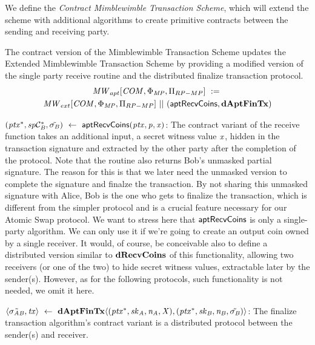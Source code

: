 We define the \emph{Contract Mimblewimble Transaction Scheme}, which will extend the scheme with additional algorithms to create primitive contracts between the sending and receiving party.

\begin{definition}
    \label{def:atom:apt-ext-mw-tx-scheme}
    The contract version of the Mimblewimble Transaction Scheme updates the Extended Mimblewimble Transaction Scheme by providing a modified version of the single party receive routine and the distributed finalize transaction protocol.
    \begin{gather*}
        \mathit{MW}_{apt}[\mathit{COM},\Phi_{\mathit{MP}},\Pi_{RP-MP}] ~:=~ \\ \mathit{MW}_{ext}[\mathit{COM},\Phi_{\mathit{MP}},\Pi_{RP-MP}] ~||~ (\mathsf{aptRecvCoins}, \mathbf{dAptFinTx})
    \end{gather*}
    \begin{asparaitem}
        \item $(\mathit{ptx}^*, \mathit{sp}\mathcal{C}_{\mathit{B}}^*, \tilde{\sigma_{\mathit{B}}}) ~\leftarrow~ \mathsf{aptRecvCoins}(\mathit{ptx},\mathit{p},\mathit{x})$: The contract variant of the receive function takes an additional input, a secret witness value
        $\mathit{x}$, hidden in the transaction signature and extracted by the other party after the completion of the protocol.
        Note that the routine also returns Bob's unmasked partial signature.
        The reason for this is that we later need the unmasked version to complete the signature and finalze the transaction.
        By not sharing this unmasked signature with Alice, Bob is the one who gets to finalize the transaction, which is different from the simpler protocol and is a crucial feature necessary for our Atomic Swap protocol.
        We want to stress here that $\mathsf{aptRecvCoins}$ is only a single-party algorithm.
        We can only use it if we're going to create an output coin owned by a single receiver.
        It would, of course, be conceivable also to define a distributed version similar to $\mathbf{dRecvCoins}$ of this functionality, allowing two receivers (or one of the two) to hide secret witness values, extractable later by the sender(s).
        However, as for the following protocols, such functionality is not needed, we omit it here.
        \item $\langle \tilde{\sigma_{\mathit{A}\mathit{B}}}, \mathit{tx} \rangle ~\leftarrow~ \mathbf{dAptFinTx} \langle (\mathit{ptx}^*,\mathit{sk}_{\mathit{A}},\mathit{\mathit{n}_{\mathit{A}}},\mathit{X}), (\mathit{ptx}^*,\mathit{sk}_{\mathit{B}},\mathit{\mathit{n}_{\mathit{B}}},\tilde{\sigma_{\mathit{B}}}) \rangle$: The finalize transaction algorithm's contract variant is a distributed protocol between the sender(s) and receiver.

\end{asparaitem}
\end{definition}
